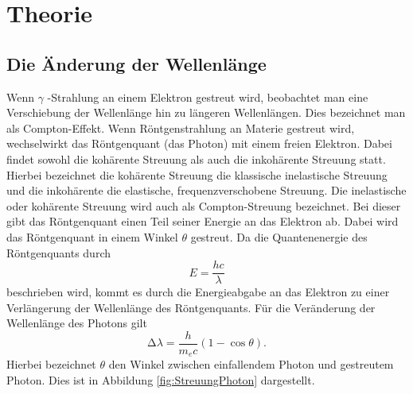 \section{Theorie}
\label{sec:Theorie}



\subsection{Die Änderung der Wellenlänge}
Wenn $\gamma$ -Strahlung an einem Elektron gestreut wird, beobachtet man eine Verschiebung der Wellenlänge hin zu längeren Wellenlängen.
Dies bezeichnet man als Compton-Effekt.
Wenn Röntgenstrahlung an Materie gestreut wird, wechselwirkt das Röntgenquant (das Photon) mit einem freien Elektron.
Dabei findet sowohl die kohärente Streuung als auch die inkohärente Streuung statt. Hierbei bezeichnet die kohärente Streuung
die klassische inelastische Streuung und die inkohärente die elastische, frequenzverschobene Streuung.
Die inelastische oder kohärente Streuung wird auch als Compton-Streuung bezeichnet.
Bei dieser gibt das Röntgenquant einen Teil seiner Energie an das Elektron ab. Dabei wird das Röntgenquant in einem Winkel $\theta$
gestreut. Da die Quantenenergie des Röntgenquants durch
\begin{equation}
	\label{eqn:E=hc/lambda}
	E =  \frac{h c}{\lambda}
\end{equation}
beschrieben wird, kommt es durch die Energieabgabe an das Elektron zu einer Verlängerung der Wellenlänge des Röntgenquants.
Für die Veränderung der Wellenlänge des Photons gilt
\begin{equation}
	\label{eqn:deltalambda}
	\increment \lambda = \frac{h}{m_e c} (1- \cos  \theta).
\end{equation}
Hierbei bezeichnet $\theta$ den Winkel zwischen einfallendem Photon und gestreutem Photon. Dies ist in Abbildung \ref{fig:StreuungPhoton}
dargestellt.

